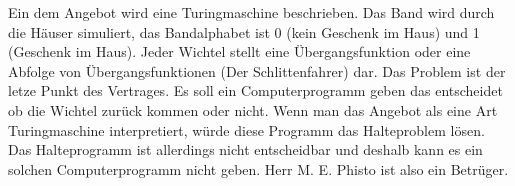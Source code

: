 \documentclass[a4]{exam}
\begin{document}
\begin{questions}

\newpage 

%
%
Ein dem Angebot wird eine Turingmaschine beschrieben. Das Band wird durch die Häuser simuliert, das Bandalphabet ist 0 (kein Geschenk im Haus) und 1 (Geschenk im Haus). Jeder Wichtel   stellt eine Übergangsfunktion oder eine Abfolge von Übergangsfunktionen (Der Schlittenfahrer) dar. Das Problem ist der letze Punkt des Vertrages. Es soll ein Computerprogramm geben das entscheidet ob die Wichtel zurück kommen oder nicht. Wenn man das Angebot als eine Art Turingmaschine interpretiert, würde diese Programm das Halteproblem lösen. Das Halteprogramm ist allerdings nicht entscheidbar und deshalb kann es ein solchen Computerprogramm nicht geben. Herr M. E. Phisto ist also ein Betrüger.


\end{questions}
\end{document}
